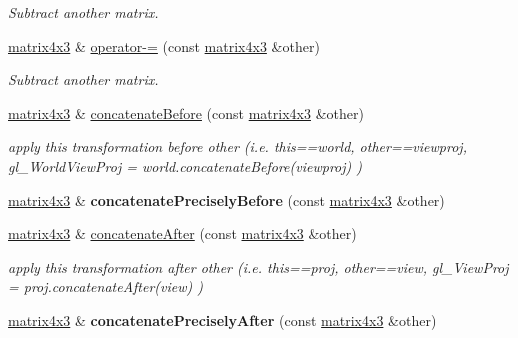 \begin{DoxyCompactItemize}
\begin{DoxyCompactList}\small\item\em Subtract another matrix. \end{DoxyCompactList}\item 
\hyperlink{classirr_1_1core_1_1matrix4x3}{matrix4x3} \& \hyperlink{classirr_1_1core_1_1matrix4x3_ad97a61b06809d712b6a61c7922da205b}{operator-\/=} (const \hyperlink{classirr_1_1core_1_1matrix4x3}{matrix4x3} \&other)\hypertarget{classirr_1_1core_1_1matrix4x3_ad97a61b06809d712b6a61c7922da205b}{}\label{classirr_1_1core_1_1matrix4x3_ad97a61b06809d712b6a61c7922da205b}

\begin{DoxyCompactList}\small\item\em Subtract another matrix. \end{DoxyCompactList}\item 
\hyperlink{classirr_1_1core_1_1matrix4x3}{matrix4x3} \& \hyperlink{classirr_1_1core_1_1matrix4x3_a33601a7cce33567d0dd2c6094b9b1e1d}{concatenate\+Before} (const \hyperlink{classirr_1_1core_1_1matrix4x3}{matrix4x3} \&other)\hypertarget{classirr_1_1core_1_1matrix4x3_a33601a7cce33567d0dd2c6094b9b1e1d}{}\label{classirr_1_1core_1_1matrix4x3_a33601a7cce33567d0dd2c6094b9b1e1d}

\begin{DoxyCompactList}\small\item\em apply this transformation before other (i.\+e. this==world, other==viewproj, gl\+\_\+\+World\+View\+Proj = world.\+concatenate\+Before(viewproj) ) \end{DoxyCompactList}\item 
\hyperlink{classirr_1_1core_1_1matrix4x3}{matrix4x3} \& {\bfseries concatenate\+Precisely\+Before} (const \hyperlink{classirr_1_1core_1_1matrix4x3}{matrix4x3} \&other)\hypertarget{classirr_1_1core_1_1matrix4x3_af5684e95ae81c6b675a878513a3ca885}{}\label{classirr_1_1core_1_1matrix4x3_af5684e95ae81c6b675a878513a3ca885}

\item 
\hyperlink{classirr_1_1core_1_1matrix4x3}{matrix4x3} \& \hyperlink{classirr_1_1core_1_1matrix4x3_a422a7297b8e903cdbf7699da22c634b2}{concatenate\+After} (const \hyperlink{classirr_1_1core_1_1matrix4x3}{matrix4x3} \&other)\hypertarget{classirr_1_1core_1_1matrix4x3_a422a7297b8e903cdbf7699da22c634b2}{}\label{classirr_1_1core_1_1matrix4x3_a422a7297b8e903cdbf7699da22c634b2}

\begin{DoxyCompactList}\small\item\em apply this transformation after other (i.\+e. this==proj, other==view, gl\+\_\+\+View\+Proj = proj.\+concatenate\+After(view) ) \end{DoxyCompactList}\item 
\hyperlink{classirr_1_1core_1_1matrix4x3}{matrix4x3} \& {\bfseries concatenate\+Precisely\+After} (const \hyperlink{classirr_1_1core_1_1matrix4x3}{matrix4x3} \&other)\hypertarget{classirr_1_1core_1_1matrix4x3_a42fe0b730b02cbba03cb14221966c077}{}\label{classirr_1_1core_1_1matrix4x3_a42fe0b730b02cbba03cb14221966c077}


\end{DoxyCompactItemize}
